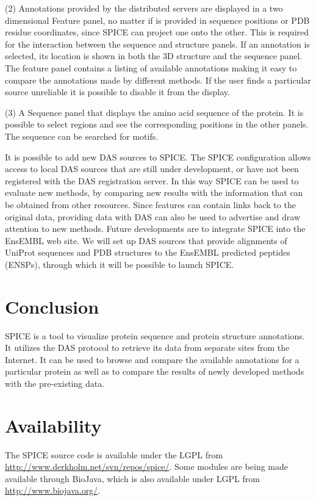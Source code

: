 \documentclass{bioinfo}
\begin{document}
(2)  Annotations provided by the distributed servers are displayed in a two
dimensional Feature panel, no matter if is provided in sequence positions or
PDB residue coordinates, since SPICE can project one onto the other. This is
required for the interaction between the sequence and structure panels. If an
annotation is selected, its location is shown in both the 3D structure and the
sequence panel.  The feature panel contains a listing of available annotations
making it easy to compare the annotations made by different methods. If the
user finds a particular source unreliable it is possible to disable it from the
display. 

(3) A Sequence panel that displays the amino acid sequence of the protein.  It
is possible to select regions and see the corresponding positions in the other
panels. The sequence can be searched  for motifs. 
 
It is possible to add new DAS sources to SPICE. The SPICE configuration allows 
access to local DAS sources that are still under development, or have not been 
registered with the DAS registration server. In this way SPICE can be used to 
evaluate new methods, by comparing new results
with the information that can be obtained from other resources. Since
features can contain links back to the original data, providing data with DAS
can also be used to advertise and draw attention to new methods.  Future
developments are to integrate SPICE  into the EnsEMBL web site. We will set up
DAS sources that provide alignments of UniProt sequences and PDB structures to
the EnsEMBL predicted peptides (ENSPs), through which it will be possible to
launch SPICE.  


\section{Conclusion}

SPICE is a tool to visualize protein sequence and protein structure annotations.
It utilizes the DAS protocol to retrieve its data from separate sites from the
Internet. It can be used to browse and compare the available annotations
for a particular protein as well as to compare the results of newly developed
methods with the pre-existing data.

\section{Availability}

The SPICE source code is available under the LGPL from 
\href{http://www.derkholm.net/svn/repos/spice/}{http://www.derkholm.net/svn/repos/spice/}.
Some modules are being made available through BioJava, which is also available
under LGPL from \href{http://www.biojava.org/}{http://www.biojava.org/}.
\end{document}
